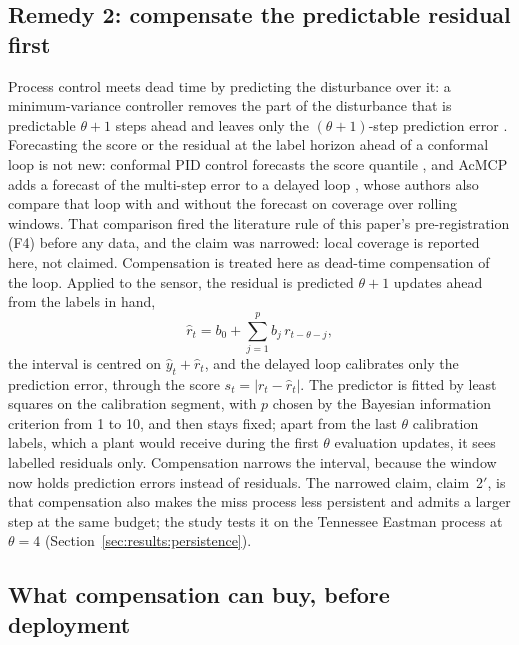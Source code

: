 \subsection{Remedy 2: compensate the predictable residual first}\label{sec:remedies:comp}

Process control meets dead time by predicting the disturbance over it: a minimum-variance
controller removes the part of the disturbance that is predictable $\theta + 1$ steps ahead and
leaves only the $(\theta+1)$-step prediction error \citep{astrom1970}. Forecasting the score or
the residual at the label horizon ahead of a conformal loop is not new: conformal PID control
forecasts the score quantile \citep{angelopoulos2023pid}, and AcMCP adds a forecast of the
multi-step error to a delayed loop \citep{wang2024acmcp}, whose authors also compare that loop
with and without the forecast on coverage over rolling windows. That comparison fired the
literature rule of this paper's pre-registration (F4) before any data, and the claim was
narrowed: local coverage is reported here, not claimed. Compensation is treated here as dead-time
compensation of the loop. Applied to the sensor, the residual is predicted $\theta + 1$ updates
ahead from the labels in hand,
\begin{equation}
  \hat r_t = b_0 + \sum_{j=1}^{p} b_j\, r_{t-\theta-j},
  \label{eq:comp}
\end{equation}
the interval is centred on $\hat y_t + \hat r_t$, and the delayed loop calibrates only the
prediction error, through the score $s_t = |r_t - \hat r_t|$. The predictor is fitted by least
squares on the calibration segment, with $p$ chosen by the Bayesian information criterion from 1
to 10, and then stays fixed; apart from the last $\theta$ calibration labels, which a plant would
receive during the first $\theta$ evaluation updates, it sees labelled residuals only.
Compensation narrows the interval, because the window now holds prediction errors instead of
residuals. The narrowed claim, claim~2$'$, is that compensation also makes the miss process less
persistent and admits a larger step at the same budget; the study tests it on the Tennessee
Eastman process at $\theta = 4$ (Section~\ref{sec:results:persistence}).

\subsection{What compensation can buy, before deployment}\label{sec:remedies:p3}

